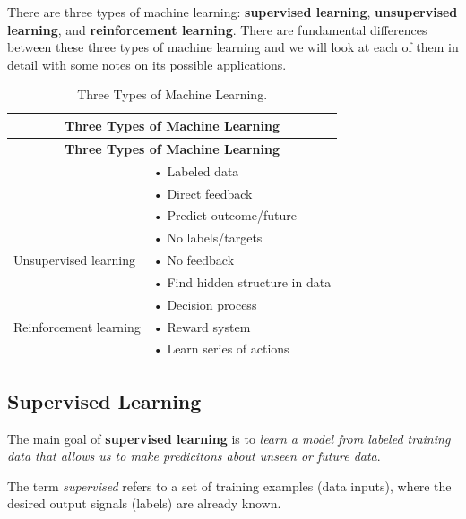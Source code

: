 \documentclass[../machine_learning_scikit.tex]{subfiles}
\begin{document}
    There are three types of machine learning: \textbf{supervised learning}, \textbf{unsupervised learning}, and \textbf{reinforcement learning}. There are fundamental differences between these three types of machine learning and we will look at each of them in detail with some notes on its possible applications.
 
    \begin{longtable}{l p{7cm}}
        \toprule
        \multicolumn{2}{c}{\textbf{Three Types of Machine Learning}} \\
        \midrule
        \endfirsthead
        
        \toprule
        \multicolumn{2}{c}{\textbf{Three Types of Machine Learning}} \\
        \midrule
        \endhead
        
        \bottomrule
        \caption{Three Types of Machine Learning.}
        \label{table:types_machine_learning}
        \endlastfoot
        
        \multirow{3}{*}{Supervised learning} 
        & • Labeled data \\
        & • Direct feedback \\
        & • Predict outcome/future \\
        \hline
        \multirow{3}{*}{Unsupervised learning}
        & • No labels/targets \\
        & • No feedback \\
        & • Find hidden structure in data \\
        \hline
        \multirow{3}{*}{Reinforcement learning}
        & • Decision process \\
        & • Reward system \\
        & • Learn series of actions \\
    \end{longtable}

    \subsection{Supervised Learning}

    The main goal of \textbf{supervised learning} is to \textit{learn a model from labeled training data that allows us to make predicitons about unseen or future data}.

    The term \textit{supervised} refers to a set of training examples (data inputs), where the desired output signals (labels) are already known.
\end{document}
